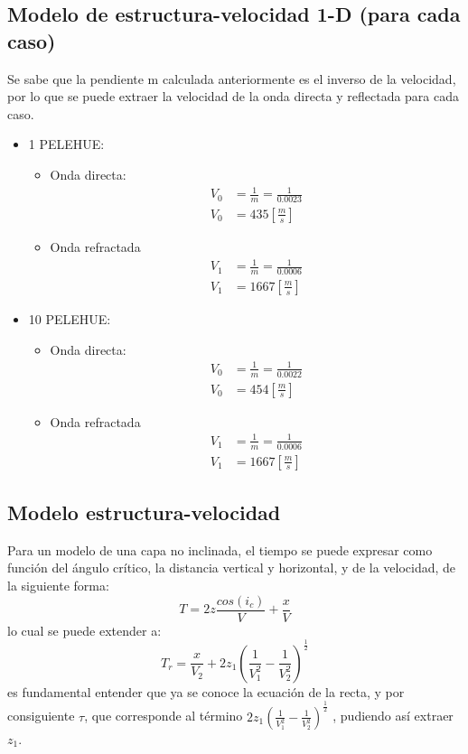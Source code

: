 \documentclass{article}
\theoremstyle{mytheoremstyle}
\theoremstyle{mytheoremstyle}
\theoremstyle{myproblemstyle}
\begin{document}
\subsection*{Modelo de estructura-velocidad 1-D (para cada caso)}
Se sabe que la pendiente m calculada anteriormente es el inverso de la velocidad, por lo que se puede extraer la velocidad de la onda directa y reflectada para cada caso.
\begin{itemize}
	\item 1 PELEHUE:\begin{itemize}
		\item Onda directa:\begin{align*}
			V_0&=\frac{1}{m}=\frac{1}{0.0023}\\
			V_0&=435\left[\frac{m}{s}\right]
		\end{align*}
		\item Onda refractada\begin{align*}
			V_1&=\frac{1}{m}=\frac{1}{0.0006}\\
			V_1&=1667\left[\frac{m}{s}\right]
		\end{align*}
	\end{itemize}
	\item 10 PELEHUE:\begin{itemize}
		\item Onda directa:\begin{align*}
			V_0&=\frac{1}{m}=\frac{1}{0.0022}\\
			V_0&=454\left[\frac{m}{s}\right]
		\end{align*}
		\item Onda refractada\begin{align*}
			V_1&=\frac{1}{m}=\frac{1}{0.0006}\\
			V_1&=1667\left[\frac{m}{s}\right]
		\end{align*}
	\end{itemize}
\end{itemize}
\subsection*{Modelo estructura-velocidad}
Para un modelo de una capa no inclinada, el tiempo se puede expresar como función del ángulo crítico, la distancia vertical y horizontal, y de la velocidad, de la siguiente forma:
\begin{equation*}
	T=2z\frac{cos(i_c)}{V}+\frac{x}{V}
\end{equation*}
lo cual se puede extender a:\begin{equation*}
	T_r=\frac{x}{V_2}+2z_1\left(\frac{1}{V_1^2}-\frac{1}{V_2^2}\right)^\frac{1}{2}
\end{equation*}
es fundamental entender que ya se conoce la ecuación de la recta,
y por consiguiente $\tau$, que corresponde al término $2z_1{\left(\frac{1}{V_1^2}-\frac{1}{V_2^2}\right)}^{\frac{1}{2}}$
, pudiendo así extraer $z_1$.
\end{document}
